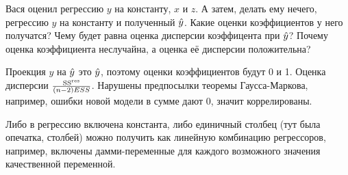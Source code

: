 \begin{problem}
Вася оценил регрессию $y$ на константу, $x$ и $z$. 
А затем, делать ему нечего, регрессию $y$ на константу и полученный $\hat{y}$. Какие оценки коэффициентов у него получатся? Чему будет равна оценка дисперсии коэффицента при $\hat{y}$? Почему оценка коэффициента неслучайна, а оценка её дисперсии положительна?


\begin{sol}
Проекция $y$ на $\hat{y}$ это $\hat{y}$, поэтому оценки коэффициентов будут 0 и 1. Оценка дисперсии $\frac{\mathrm{SS}^{\text{res}}}{(n-2)ESS}$. Нарушены предпосылки теоремы Гаусса-Маркова, например, ошибки новой модели в сумме дают 0, значит коррелированы.
\end{sol}
\end{problem}




\begin{problem}

\begin{sol}
Либо в регрессию включена константа, либо единичный столбец (тут была опечатка, столбей) можно получить как линейную комбинацию регрессоров, например, включены дамми-переменные для каждого возможного значения качественной переменной.
\end{sol}
\end{problem}


